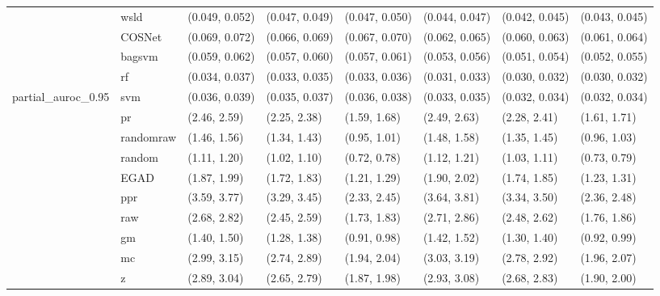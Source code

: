 \begin{table}[H]
{\begin{tabular}{llllllll}
 & wsld & (0.049, 0.052) & (0.047, 0.049) & (0.047, 0.050) & (0.044, 0.047) & (0.042, 0.045) & (0.043, 0.045)\\

 & COSNet & (0.069, 0.072) & (0.066, 0.069) & (0.067, 0.070) & (0.062, 0.065) & (0.060, 0.063) & (0.061, 0.064)\\

 & bagsvm & (0.059, 0.062) & (0.057, 0.060) & (0.057, 0.061) & (0.053, 0.056) & (0.051, 0.054) & (0.052, 0.055)\\

 & rf & (0.034, 0.037) & (0.033, 0.035) & (0.033, 0.036) & (0.031, 0.033) & (0.030, 0.032) & (0.030, 0.032)\\

\multirow{-15}{*}{\raggedright\arraybackslash partial\_auroc\_0.95} & svm & (0.036, 0.039) & (0.035, 0.037) & (0.036, 0.038) & (0.033, 0.035) & (0.032, 0.034) & (0.032, 0.034)\\
\cmidrule{1-8}
 & pr & (2.46, 2.59) & (2.25, 2.38) & (1.59, 1.68) & (2.49, 2.63) & (2.28, 2.41) & (1.61, 1.71)\\

 & randomraw & (1.46, 1.56) & (1.34, 1.43) & (0.95, 1.01) & (1.48, 1.58) & (1.35, 1.45) & (0.96, 1.03)\\

 & random & (1.11, 1.20) & (1.02, 1.10) & (0.72, 0.78) & (1.12, 1.21) & (1.03, 1.11) & (0.73, 0.79)\\

 & EGAD & (1.87, 1.99) & (1.72, 1.83) & (1.21, 1.29) & (1.90, 2.02) & (1.74, 1.85) & (1.23, 1.31)\\

 & ppr & (3.59, 3.77) & (3.29, 3.45) & (2.33, 2.45) & (3.64, 3.81) & (3.34, 3.50) & (2.36, 2.48)\\

 & raw & (2.68, 2.82) & (2.45, 2.59) & (1.73, 1.83) & (2.71, 2.86) & (2.48, 2.62) & (1.76, 1.86)\\

 & gm & (1.40, 1.50) & (1.28, 1.38) & (0.91, 0.98) & (1.42, 1.52) & (1.30, 1.40) & (0.92, 0.99)\\

 & mc & (2.99, 3.15) & (2.74, 2.89) & (1.94, 2.04) & (3.03, 3.19) & (2.78, 2.92) & (1.96, 2.07)\\

 & z & (2.89, 3.04) & (2.65, 2.79) & (1.87, 1.98) & (2.93, 3.08) & (2.68, 2.83) & (1.90, 2.00)\\


\end{tabular}}
\end{table}
